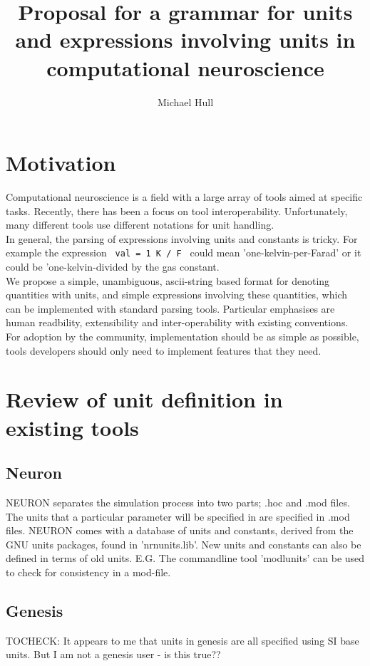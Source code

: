 \documentclass{article}
\title{Proposal for a  grammar for units and expressions involving units in computational neuroscience}
\author{Michael Hull}
\begin{document}
\maketitle

\tableofcontents

\section{Motivation}

Computational neuroscience is a field with a large 
array of tools aimed at specific tasks. Recently, 
there has been a focus on tool interoperability. 
Unfortunately, many different tools use different 
notations for unit handling.\\


In general, the parsing of expressions involving units and constants is tricky. For example the expression
\verb| val = 1 K / F | could mean 'one-kelvin-per-Farad' or it could be 'one-kelvin-divided by the gas constant. \\

We propose a simple, unambiguous, ascii-string based format for denoting quantities with units, and 
simple expressions involving these quantities, which can be implemented with standard parsing tools. 
Particular emphasises are human readbility, extensibility and inter-operability with existing conventions.  
For adoption by the community, implementation should be as simple as possible, tools developers should only need 
to implement features that they need.




\newpage
\section{Review  of unit definition in existing tools}

\subsection*{Neuron}
NEURON separates the simulation process into two parts; .hoc and .mod files. The units that a particular parameter will be specified in are specified in .mod files. NEURON comes with a database of units and constants, derived from the GNU units packages, found in 'nrnunits.lib'. New units and constants can also be defined in terms of old units. E.G. The commandline tool 'modlunits' can be used to check for consistency in a mod-file.

\subsection*{Genesis}
TOCHECK: It appears to me that units in genesis are all specified using SI base units. But  I am not a genesis user - is this true??
\end{document}
